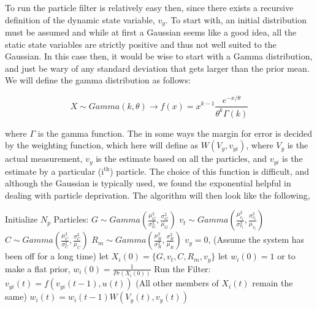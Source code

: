 To run the particle filter is relatively easy then, since there exists 
a recursive definition of the dynamic state variable, $v_y$. To start
with, an initial distribution must be assumed and while at first a 
Gaussian seems like a good idea, all the static state variables are strictly
positive and thus not well suited to the Gaussian. In this case then,
it would be wise to start with a Gamma distribution, and just be wary of
any standard deviation that gets larger than the prior mean. We will define
the gamma distribution as follows:

\begin{equation}
X \sim Gamma(k, \theta) \rightarrow f(x) = x^{k-1}\frac{e^{-x/\theta}}{\theta^k\Gamma(k)}
\end{equation}

where $\Gamma$ is the gamma function.
The in some ways the margin for error is decided by the weighting function, which
here will define as $W(V_y, v_{yi})$, where $V_y$ is the actual measurement, $v_y$ is the 
estimate based on all the particles, and 
$v_{yi}$ is the estimate by a particular (i$^{\text{th}}$) particle. The choice of this function is difficult,
and although the Gaussian is typically used, we found the exponential helpful
in dealing with particle deprivation.  The algorithm will then look like the following,

\begin{algorithmic}
\STATE Initialize $N_p$ Particles:
    \STATE $G \sim Gamma(\frac{\mu^2_G}{\sigma^2_G}, \frac{\sigma^2_G}{\mu_G})$
    \STATE $v_t \sim Gamma(\frac{\mu^2_{v_t}}{\sigma^2_{v_t}}, \frac{\sigma^2_{v_t}}{\mu_{v_t}})$
    \STATE $C \sim Gamma(\frac{\mu^2_C}{\sigma^2_C}, \frac{\sigma^2_C}{\mu_C})$
    \STATE $R_m \sim Gamma(\frac{\mu^2_R}{\sigma^2_R}, \frac{\sigma^2_R}{\mu_R})$
    \STATE $v_y = 0$, (Assume the system has been off for a long time)
    \STATE let $X_i(0) = \{G, v_t, C, R_m, v_y\}$
    \STATE let $w_i(0) = 1$ or to make a flat prior, $w_i(0) = \frac{1}{Pr(X_i(0))}$ 
\ENDFOR
\STATE Run the Filter:
        \STATE $v_{yi}(t) = f(v_{yi}(t-1), u(t))$
        \STATE (All other members of $X_i(t)$ remain the same)
        \STATE $w_i(t) = w_i(t-1)W(V_y(t), v_y(t))$
    \ENDFOR
\ENDFOR
\end{algorithmic}

